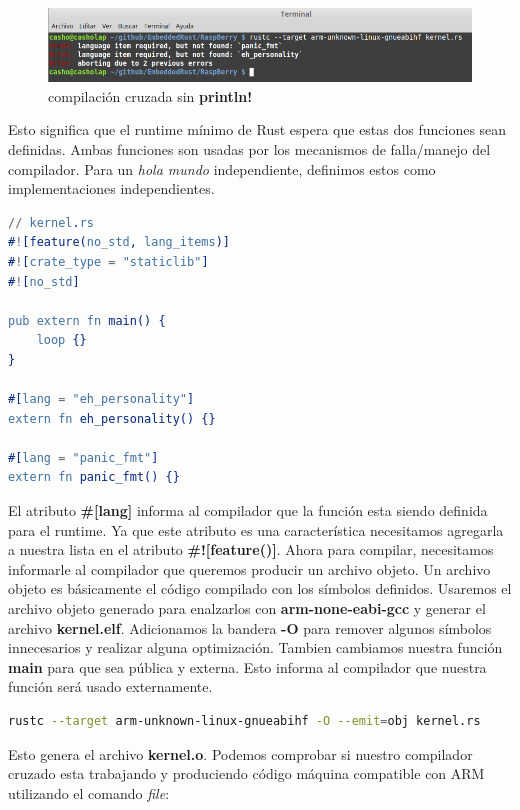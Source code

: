 \documentclass[12pt, twoside]{report}
\begin{document}
\begin{figure}
	\centering	\includegraphics[width=1\linewidth]{rust_kernel2.png}
	\caption{compilación cruzada sin \textbf{println!}}
	\label{fig0002}
\end{figure}

Esto significa que el runtime mínimo de Rust espera que estas dos funciones sean definidas. Ambas funciones son usadas por los mecanismos de falla/manejo del compilador. Para un \textit{hola mundo} independiente, definimos estos como implementaciones independientes.

\begin{lstlisting}[language=erlang]
// kernel.rs
#![feature(no_std, lang_items)]
#![crate_type = "staticlib"]
#![no_std]

pub extern fn main() {  
    loop {}
}

#[lang = "eh_personality"]
extern fn eh_personality() {}

#[lang = "panic_fmt"]
extern fn panic_fmt() {}  
\end{lstlisting}

El atributo \textbf{\#[lang]} informa al compilador que la función esta siendo definida para el runtime. Ya que este atributo es una característica necesitamos agregarla a nuestra lista en el atributo \textbf{\#![feature()]}. Ahora para compilar, necesitamos informarle al compilador que queremos producir un archivo objeto. Un archivo objeto es básicamente el código compilado con los símbolos definidos. Usaremos el archivo objeto generado para enalzarlos con \textbf{arm-none-eabi-gcc} y generar el archivo \textbf{kernel.elf}. Adicionamos la bandera \textbf{-O} para remover algunos símbolos innecesarios y realizar alguna optimización. Tambien cambiamos nuestra función \textbf{main} para que sea pública y externa.  Esto informa al compilador que nuestra función será usado externamente.
\begin{lstlisting}[language=bash]
rustc --target arm-unknown-linux-gnueabihf -O --emit=obj kernel.rs
\end{lstlisting}

Esto genera el archivo \textbf{kernel.o}. Podemos comprobar si nuestro compilador cruzado esta trabajando y produciendo código máquina compatible con ARM utilizando el comando \emph{file}:
\end{document}
